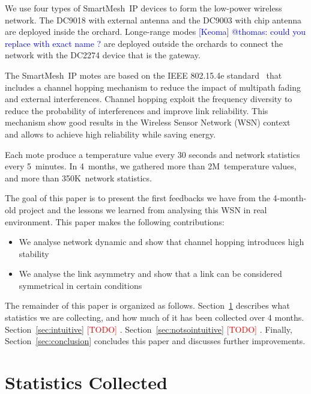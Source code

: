 \documentclass{sig-alternate}
\newcommand{\todo}[1]        {\textcolor{red}{[TODO] #1}}
\newcommand{\keoma}[1]       {\textcolor{blue}{[Keoma] #1}}
\newcommand{\smip}           {SmartMesh~IP\xspace}
\begin{document}

We use four types of \smip devices to form the low-power wireless network.
The DC9018 with external antenna and the DC9003 with chip antenna are deployed inside the orchard.
Longe-range modes \keoma{@thomas: could you replace with exact name ?} are deployed outside the orchards to connect the network with the DC2274 device that is the gateway.


The \smip motes are based on the IEEE 802.15.4e standard~\cite{std_ieee802154e} that includes a channel hopping mechanism to reduce the impact of multipath fading and external interferences.
Channel hopping exploit the frequency diversity to reduce the probability of interferences and improve link reliability.
This mechanism show good results in the Wireless Sensor Network (WSN) context~\cite{watteyne2010mitigating, watteyne2009reliability} and allows to achieve high reliability while saving energy.


Each mote produce a temperature value every 30 seconds and network statistics every 5~minutes.
In 4~months, we gathered more than 2M~temperature values, and more than 350K~network statistics.


The goal of this paper is to present the first feedbacks we have from the 4-month-old project and the lessons we learned from analysing this WSN in real environment.
This paper makes the following contributions:
\begin{itemize}
    \item{We analyse network dynamic and show that channel hopping introduces high stability}
    \item{We analyse the link asymmetry and show that a link can be considered symmetrical in certain conditions}
\end{itemize}


The remainder of this paper is organized as follows.
Section~\ref{sec:collected} describes what statistics we are collecting, and how much of it has been collected over 4 months.
Section~\ref{sec:intuitive} \todo{}.
Section~\ref{sec:notsointuitive} \todo{}.
Finally, Section~\ref{sec:conclusion} concludes this paper and discusses further improvements.

\section{Statistics Collected}
\label{sec:collected}
\end{document}
